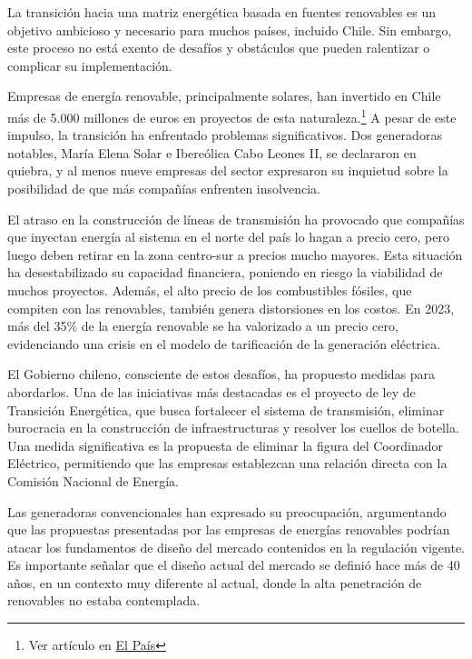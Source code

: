 La transición hacia una matriz energética basada en fuentes renovables es un objetivo ambicioso y necesario para muchos países, incluido Chile. Sin embargo, este proceso no está exento de desafíos y obstáculos que pueden ralentizar o complicar su implementación.\vspace{2.5mm}

Empresas de energía renovable, principalmente solares, han invertido en Chile más de 5.000 millones de euros en proyectos de esta naturaleza.\footnote{Ver artículo en \href{{https://elpais.com/chile/2023-06-20/el-plan-del-ministro-de-energia-de-gabriel-boric-para-aliviar-a-las-renovables.html}}{El País}} A pesar de este impulso, la transición ha enfrentado problemas significativos. Dos generadoras notables, María Elena Solar e Ibereólica Cabo Leones II, se declararon en quiebra, y al menos nueve empresas del sector expresaron su inquietud sobre la posibilidad de que más compañías enfrenten insolvencia.\vspace{2.5mm}

El atraso en la construcción de líneas de transmisión ha provocado que compañías que inyectan energía al sistema en el norte del país lo hagan a precio cero, pero luego deben retirar en la zona centro-sur a precios mucho mayores. Esta situación ha desestabilizado su capacidad financiera, poniendo en riesgo la viabilidad de muchos proyectos. Además, el alto precio de los combustibles fósiles, que compiten con las renovables, también genera distorsiones en los costos. En 2023, más del 35\% de la energía renovable se ha valorizado a un precio cero, evidenciando una crisis en el modelo de tarificación de la generación eléctrica.\vspace{2.5mm}

El Gobierno chileno, consciente de estos desafíos, ha propuesto medidas para abordarlos. Una de las iniciativas más destacadas es el proyecto de ley de Transición Energética, que busca fortalecer el sistema de transmisión, eliminar burocracia en la construcción de infraestructuras y resolver los cuellos de botella. Una medida significativa es la propuesta de eliminar la figura del Coordinador Eléctrico, permitiendo que las empresas establezcan una relación directa con la Comisión Nacional de Energía.\vspace{2.5mm}

Las generadoras convencionales han expresado su preocupación, argumentando que las propuestas presentadas por las empresas de energías renovables podrían atacar los fundamentos de diseño del mercado contenidos en la regulación vigente. Es importante señalar que el diseño actual del mercado se definió hace más de 40 años, en un contexto muy diferente al actual, donde la alta penetración de renovables no estaba contemplada.\vspace{2.5mm}

